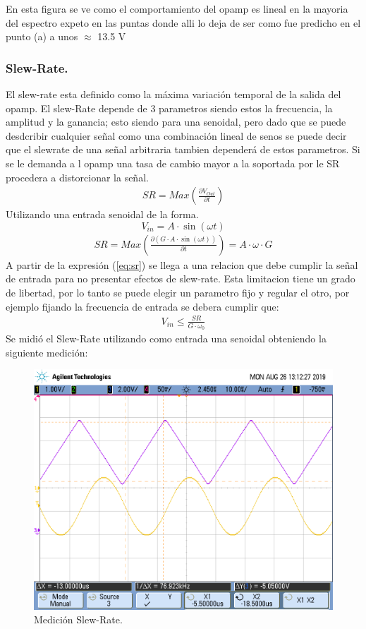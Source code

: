 En esta figura se ve como el comportamiento del opamp es lineal en la mayoria del espectro expeto en las puntas donde alli lo deja de ser como fue predicho en el punto (a) a unos $\approx$ 13.5 V
\subsubsection{Slew-Rate.}
El slew-rate esta definido como la máxima variación temporal de la salida del opamp. El slew-Rate depende de 3 parametros siendo estos la frecuencia, la amplitud y la ganancia; esto siendo para una senoidal, pero dado que se puede desdcribir cualquier señal como una combinación lineal de senos se puede decir que el slewrate de una señal arbitraria tambien dependerá de estos parametros.
Si se le demanda a l opamp una tasa de cambio mayor a la soportada por le SR procedera a distorcionar la señal.
\begin{align}  SR= Max\left( \frac{\partial V_{Out}}{\partial t}\right)  \end{align}
Utilizando una entrada senoidal de la forma.
$$V_{in}=A\cdot \sin (\omega t)$$
\begin{align}   SR= Max\left( \frac{\partial (G\cdot A\cdot \sin (\omega t))}{\partial t}\right) = A \cdot \omega \cdot G  
\label{eq:sr}
\end{align}
A partir de la expresión  (\ref{eq:sr}) se llega a una relacion que debe cumplir la señal de entrada para no presentar efectos de slew-rate. Esta limitacion tiene un grado de libertad, por lo tanto se puede elegir un parametro fijo y regular el otro, por ejemplo fijando la frecuencia de entrada se debera cumplir que:
\begin{align} V_{in}	\leq \frac{SR}{G\cdot \omega_0}\end{align}
Se midió el Slew-Rate  utilizando como entrada una senoidal obteniendo la siguiente medición:
\begin{figure}[H]	
	\centering
	\includegraphics[width=\textwidth]{Ejercicio1/Imagenes/slew_rate1.png}
	\caption{Medición Slew-Rate.}
	\label{fig:SlewRate}
\end{figure}

